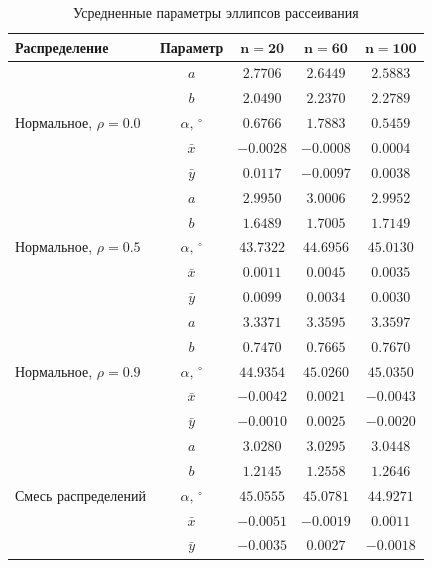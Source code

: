 \documentclass[a4paper, 14pt]{extarticle}
\begin{document}
\begin{table}[H]
    \centering
    \caption{Усредненные параметры эллипсов рассеивания}
    \label{tab:ellipses}
    \begin{tabular}{|l|c|c|c|c|}
        \hline
        \textbf{Распределение} & \textbf{Параметр} & $\mathbf{n=20}$ & $\mathbf{n=60}$ & $\mathbf{n=100}$ \\ \hline
        \multirow{5}{*}{Нормальное, $\rho=0.0$}
        & $a$ & $2.7706$ & $2.6449$ & $2.5883$ \\ \cline{2-5}
        & $b$ & $2.0490$ & $2.2370$ & $2.2789$ \\ \cline{2-5}
        & $\alpha,\,^\circ$ & $0.6766$ & $1.7883$ & $0.5459$ \\ \cline{2-5}
        & $\bar{x}$ & $-0.0028$ & $-0.0008$ & $0.0004$ \\ \cline{2-5}
        & $\bar{y}$ & $0.0117$ & $-0.0097$ & $0.0038$ \\ \hline

        \multirow{5}{*}{Нормальное, $\rho=0.5$}
        & $a$ & $2.9950$ & $3.0006$ & $2.9952$ \\ \cline{2-5}
        & $b$ & $1.6489$ & $1.7005$ & $1.7149$ \\ \cline{2-5}
        & $\alpha,\,^\circ$ & $43.7322$ & $44.6956$ & $45.0130$ \\ \cline{2-5}
        & $\bar{x}$ & $0.0011$ & $0.0045$ & $0.0035$ \\ \cline{2-5}
        & $\bar{y}$ & $0.0099$ & $0.0034$ & $0.0030$ \\ \hline

        \multirow{5}{*}{Нормальное, $\rho=0.9$}
        & $a$ & $3.3371$ & $3.3595$ & $3.3597$ \\ \cline{2-5}
        & $b$ & $0.7470$ & $0.7665$ & $0.7670$ \\ \cline{2-5}
        & $\alpha,\,^\circ$ & $44.9354$ & $45.0260$ & $45.0350$ \\ \cline{2-5}
        & $\bar{x}$ & $-0.0042$ & $0.0021$ & $-0.0043$ \\ \cline{2-5}
        & $\bar{y}$ & $-0.0010$ & $0.0025$ & $-0.0020$ \\ \hline

        \multirow{5}{*}{Смесь распределений}
        & $a$ & $3.0280$ & $3.0295$ & $3.0448$ \\ \cline{2-5}
        & $b$ & $1.2145$ & $1.2558$ & $1.2646$ \\ \cline{2-5}
        & $\alpha,\,^\circ$ & $45.0555$ & $45.0781$ & $44.9271$ \\ \cline{2-5}
        & $\bar{x}$ & $-0.0051$ & $-0.0019$ & $0.0011$ \\ \cline{2-5}
        & $\bar{y}$ & $-0.0035$ & $0.0027$ & $-0.0018$ \\ \hline
    \end{tabular}
\end{table}
\end{document}
